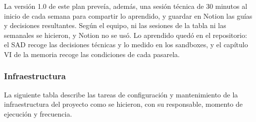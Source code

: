 La versión 1.0 de este plan preveía, además, una sesión técnica de 30 minutos al inicio de cada semana para compartir lo aprendido, y guardar en Notion las guías y decisiones resultantes. Según el equipo, ni las sesiones de la tabla ni las semanales se hicieron, y Notion no se usó. Lo aprendido quedó en el repositorio: el SAD recoge las decisiones técnicas y lo medido en los sandboxes, y el capítulo VI de la memoria recoge las condiciones de cada pasarela.

\subsubsection{Infraestructura}

La siguiente tabla describe las tareas de configuración y mantenimiento de la infraestructura del proyecto como se hicieron, con su responsable, momento de ejecución y frecuencia.

